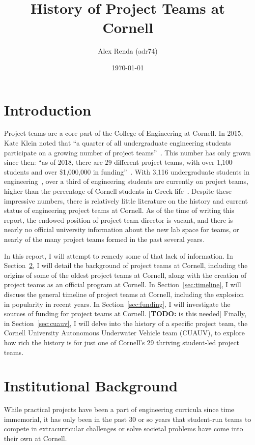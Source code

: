\documentclass[12pt]{article}
\title{History of Project Teams at Cornell}
\author{Alex Renda (adr74)}
\date{\monthyeardate\today}
\newcommand{\todo}[1]{{\color{red}[\textbf{TODO:} #1]}}
\begin{document}
\maketitle

\section{Introduction}

Project teams are a core part of the College of Engineering at Cornell.
In 2015, Kate Klein noted that ``a quarter of all undergraduate engineering students participate on a growing number of project teams''~\cite{klein_engineering_2015}.
This number has only grown since then:
``as of 2018, there are 29 different project teams, with over 1,100 students and over \$1,000,000 in funding''~\cite{noauthor_project_2018}.
With 3,116 undergraduate students in engineering~\cite{westervelt_key_2017}, over a third of engineering students are currently on project teams, higher than the percentage of Cornell students in Greek life~\cite{noauthor_sorority_2017}.
Despite these impressive numbers, there is relatively little literature on the history and current status of engineering project teams at Cornell.
As of the time of writing this report, the endowed position of project team director is vacant, and there is nearly no official university information about the new lab space for teams, or nearly of the many project teams formed in the past several years.

In this report, I will attempt to remedy some of that lack of information.
In Section~\ref{sec:background}, I will detail the background of project teams at Cornell, including the origins of some of the oldest project teams at Cornell, along with the creation of project teams as an official program at Cornell.
In Section~\ref{sec:timeline}, I will discuss the general timeline of project teams at Cornell, including the explosion in popularity in recent years.
In Section~\ref{sec:funding}, I will investigate the sources of funding for project teams at Cornell. \todo{is this needed}
Finally, in Section~\ref{sec:cuauv}, I will delve into the history of a specific project team, the Cornell University Autonomous Underwater Vehicle team (CUAUV), to explore how rich the history is for just one of Cornell's 29 thriving student-led project teams.

\section{Institutional Background}
\label{sec:background}
While practical projects have been a part of engineering curricula since time immemorial, it has only been in the past 30 or so years that student-run teams to compete in extracurricular challenges or solve societal problems have come into their own at Cornell.
\end{document}
